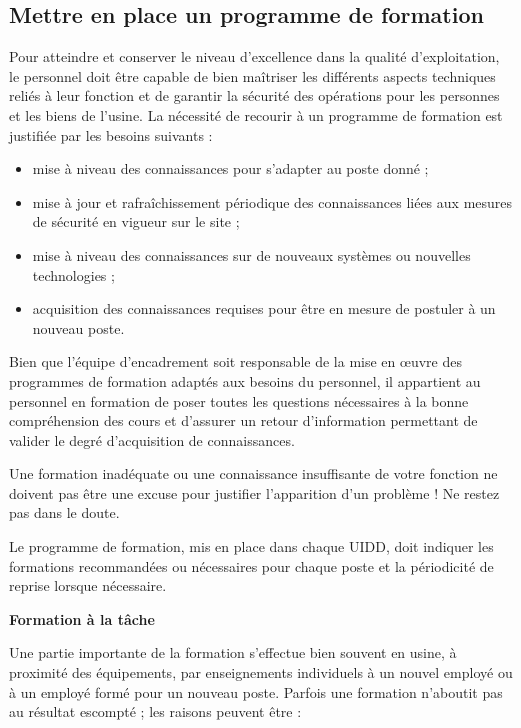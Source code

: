 \subsection{Mettre en place un programme de formation}

Pour atteindre et conserver le niveau d’excellence dans la qualité d’exploitation, le personnel doit être capable de bien maîtriser les différents aspects techniques reliés à leur fonction et de garantir la sécurité des opérations pour les personnes et les biens de l’usine. La nécessité de recourir à un programme de formation est justifiée par les besoins 
suivants :

\begin{itemize}

\item mise à niveau des connaissances pour s’adapter au poste donné ;
\item mise à jour et rafraîchissement périodique des connaissances liées aux mesures de sécurité en vigueur sur le site ;
\item mise à niveau des connaissances sur de nouveaux systèmes ou nouvelles technologies ;
\item acquisition des connaissances requises pour être en mesure de postuler à un nouveau poste.


\end{itemize}

Bien que l’équipe d’encadrement soit responsable de la mise en œuvre des programmes de formation adaptés aux besoins du personnel, il appartient au personnel en formation de poser toutes les questions nécessaires à la bonne compréhension des cours et d’assurer un retour d’information permettant de valider le degré d’acquisition de connaissances.

\vspace{0.3cm} 

Une formation inadéquate ou une connaissance insuffisante de votre fonction ne doivent pas être une excuse pour justifier l’apparition d’un problème ! Ne restez pas dans le doute.

\vspace{0.3cm} 

Le programme de formation, mis en place dans chaque UIDD, doit indiquer les formations recommandées ou nécessaires pour chaque poste et la périodicité de reprise lorsque nécessaire.




\textbf{Formation à la tâche}

Une partie importante de la formation s’effectue bien souvent en usine, à proximité des équipements, par enseignements individuels à un nouvel employé ou à un employé formé pour un nouveau poste.
Parfois une formation n’aboutit pas au résultat escompté ;  les raisons peuvent être :

